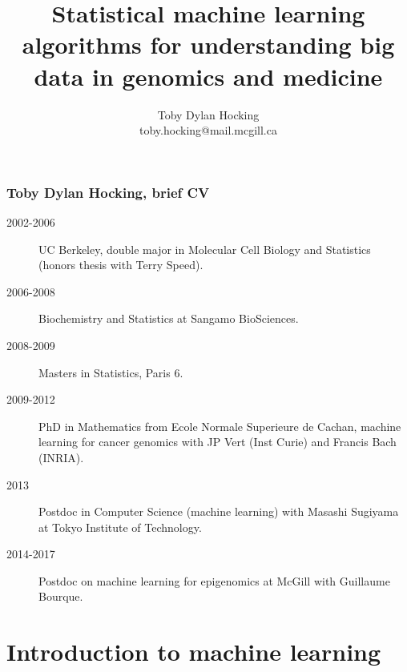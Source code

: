 \documentclass{beamer}
\begin{document}
\title{Statistical machine 
learning algorithms for 
understanding big data in
  genomics and medicine}

\author{
  Toby Dylan Hocking\\
  toby.hocking@mail.mcgill.ca
}

\maketitle

\begin{frame}
  \frametitle{Toby Dylan Hocking, brief CV}
  \begin{description}
  \item[2002-2006] UC Berkeley, double major in Molecular Cell Biology
    and Statistics (honors thesis with Terry Speed).
  \item[2006-2008] Biochemistry and Statistics at Sangamo BioSciences.
  \item[2008-2009] Masters in Statistics, Paris 6.
  \item[2009-2012] PhD in Mathematics from Ecole Normale Superieure de
    Cachan, machine learning for cancer genomics with JP Vert (Inst Curie)
    and Francis Bach (INRIA).
  \item[2013] Postdoc in Computer Science (machine learning) with Masashi Sugiyama at Tokyo
    Institute of Technology.
  \item[2014-2017] Postdoc on machine learning for epigenomics
    at McGill with Guillaume Bourque.
  \end{description}
\end{frame}

\section{Introduction to machine learning}
\end{document}
